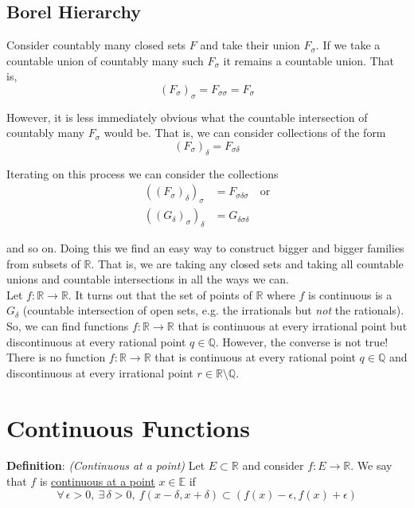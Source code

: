 \documentclass[12pt]{article}
\newlength\tindent
\renewcommand{\indent}{\hspace*{\tindent}}
\newcommand{\R}{\mathbb R}
\newcommand{\Q}{\mathbb Q}
\newcommand{\E}{\mathbb E}
\begin{document}
\subsection{Borel Hierarchy}

\indent Consider countably many closed sets $F$ and take their union $F_\sigma$. If we take a countable union of countably many such $F_\sigma$ it remains a countable union. That is,
\begin{equation*}
	(F_\sigma)_\sigma = F_{\sigma\sigma} = F_\sigma
\end{equation*}

However, it is less immediately obvious what the countable intersection of countably many $F_\sigma$ would be. That is, we can consider collections of the form
\begin{equation*}
	(F_\sigma)_\delta = F_{\sigma\delta}
\end{equation*}

Iterating on this process we can consider the collections
\begin{align*}
	((F_\sigma)_\delta)_\sigma &= F_{\sigma\delta\sigma} \quad \text{or} \\
	((G_\delta)_\sigma)_\delta &= G_{\delta\sigma\delta}
\end{align*}

and so on. Doing this we find an easy way to construct bigger and bigger families from subsets of $\R$. That is, we are taking any closed sets and taking all countable unions and countable intersections in all the ways we can. \\

\indent Let $f:\R\to\R$. It turns out that the set of points of $\R$ where $f$ is continuous is a $G_\delta$ (countable intersection of open sets, e.g. the irrationals but {\em not} the rationals). So, we can find functions $f:\R\to\R$ that is continuous at every irrational point but discontinuous at every rational point $q \in \Q$. However, the converse is not true! There is no function $f:\R\to\R$ that is continuous at every rational point $q \in \Q$ and discontinuous at every irrational point $r \in \R\setminus\Q$. 

\section{Continuous Functions}

%
%
{\bf Definition}: {\em (Continuous at a point)} Let $E \subset \R$ and consider $f:E\to\R$. We say that $f$ is \underline{continuous at a point} $x \in \E$ if
\begin{equation*}
	\forall\,\epsilon > 0,~\exists\,\delta > 0,~ f(x - \delta, x + \delta) \subset (f(x) - \epsilon, f(x) + \epsilon)
\end{equation*}
\end{document}
